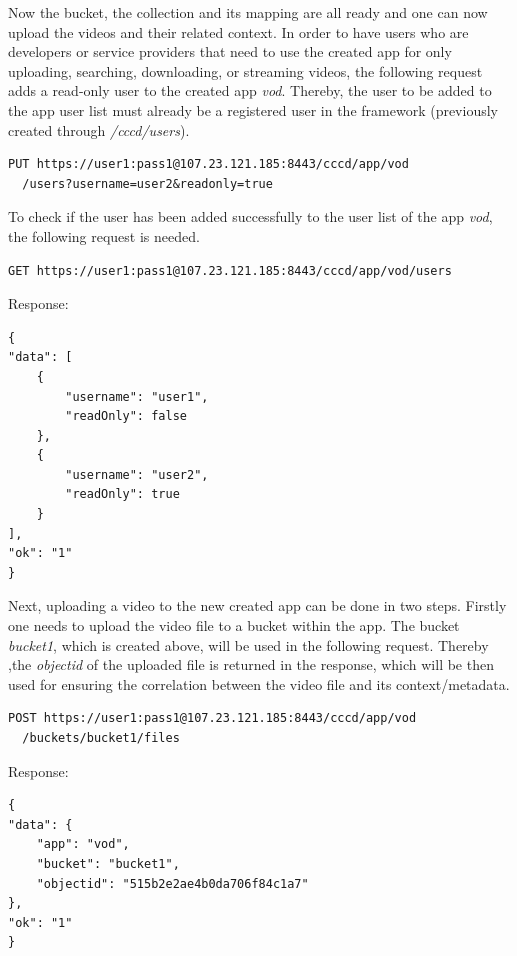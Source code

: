 Now the bucket, the collection and its mapping are all ready and one can now upload the videos and their related context. In order to have users who are developers or service providers that need to use the created app for only uploading, searching, downloading, or streaming videos, the following request adds a read-only user to the created app \textit{vod}. Thereby, the user to be added to the app user list must already be  a registered user in the framework (previously created through \textit{/cccd/users}).

\begin{code}
\begin{verbatim}
PUT https://user1:pass1@107.23.121.185:8443/cccd/app/vod
  /users?username=user2&readonly=true
\end{verbatim}
\end{code}

To check if the user has been added successfully to the user list of the app \textit{vod}, the following request is needed.

\begin{code}
\begin{verbatim}
GET https://user1:pass1@107.23.121.185:8443/cccd/app/vod/users
\end{verbatim}
Response:
\begin{verbatim}
{
"data": [
	{
		"username": "user1",
		"readOnly": false
	},
	{
		"username": "user2",
		"readOnly": true
	}
],
"ok": "1"
}
\end{verbatim}
\end{code}

Next, uploading a video to the new created app can be done in two steps. Firstly one needs to upload the video file to a bucket within the app. The bucket \textit{bucket1}, which is created above, will be used in the following request. Thereby ,the \textit{objectid} of the uploaded file is returned in the response, which will be then used for ensuring the correlation between the video file and its context/metadata.
\begin{code}
\begin{verbatim}
POST https://user1:pass1@107.23.121.185:8443/cccd/app/vod
  /buckets/bucket1/files
\end{verbatim}
Response:
\begin{verbatim}
{
"data": {
	"app": "vod",
	"bucket": "bucket1",
	"objectid": "515b2e2ae4b0da706f84c1a7"
},
"ok": "1"
}
\end{verbatim}
\end{code}

